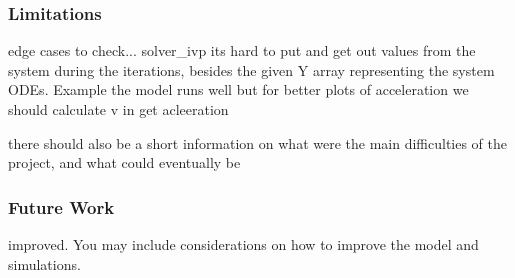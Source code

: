 \documentclass[runningheads]{llncs}
\begin{document}
\subsubsection*{Limitations}
edge cases to check... 
solver\_ivp its hard to put and get out values from the system during the iterations, besides the given Y array representing the system ODEs. Example the model runs well but for better plots of acceleration we should calculate v in get acleeration 

 there should also be a short information on what were the main difficulties of the project, and what could eventually be


\subsubsection*{Future Work}
improved. You may include considerations on how to improve the model and simulations.



\end{document}
